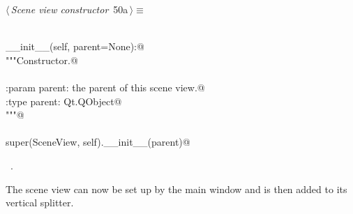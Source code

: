\documentclass[
    a4paper,      %
    10pt,         %
    openright,    %
    notitlepage,  %
    parskip=half, %
]{scrreprt}       %
\theoremstyle{definition}                    %
\begin{document}
\begin{flushleft} \small
\begin{minipage}{\linewidth}\label{scrap73}\raggedright\small
{} $\langle\,${\itshape Scene view constructor}\nobreak\ {\footnotesize {50a}}$\,\rangle\equiv$
\vspace{-1ex}
\begin{list}{}{} \item
\mbox{}\lstinline@@\\
\mbox{}\lstinline@def __init__(self, parent=None):@\\
\mbox{}\lstinline@    """Constructor.@\\
\mbox{}\lstinline@@\\
\mbox{}\lstinline@    :param parent: the parent of this scene view.@\\
\mbox{}\lstinline@    :type parent: Qt.QObject@\\
\mbox{}\lstinline@    """@\\
\mbox{}\lstinline@@\\
\mbox{}\lstinline@    super(SceneView, self).__init__(parent)@\\
\mbox{}\lstinline@@{\NWsep}
\end{list}
\vspace{-1.5ex}
\footnotesize
\begin{list}{}{\setlength{\itemsep}{-\parsep}\setlength{\itemindent}{-\leftmargin}}
\item \NWtxtMacroRefIn\ .

\item{}
\end{list}
\end{minipage}\vspace{4ex}
\end{flushleft}
The scene view can now be set up by the main window and is then added to its
vertical splitter.
\end{document}
